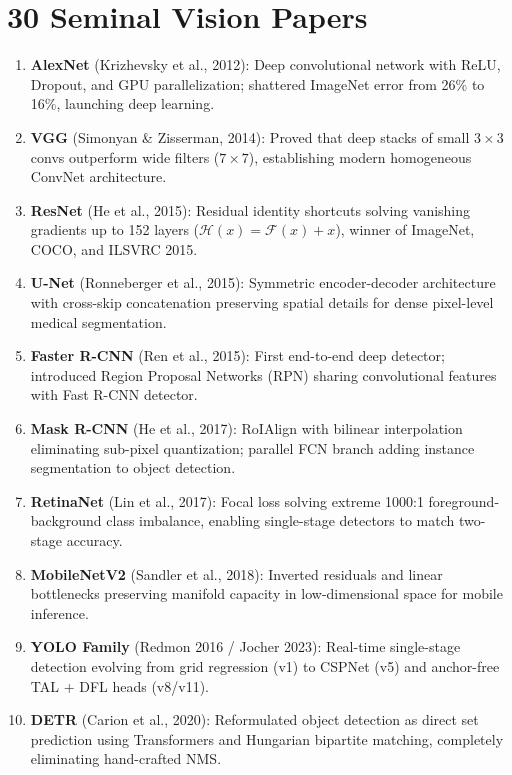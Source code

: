 \section{30 Seminal Vision Papers}\label{sec:papers}

\begin{enumerate}[leftmargin=*,itemsep=0.5pt,topsep=1pt]
\item \textbf{AlexNet} (Krizhevsky et al., 2012): Deep convolutional network with ReLU, Dropout, and GPU parallelization; shattered ImageNet error from 26\% to 16\%, launching deep learning.
\item \textbf{VGG} (Simonyan \& Zisserman, 2014): Proved that deep stacks of small $3\times 3$ convs outperform wide filters ($7\times 7$), establishing modern homogeneous ConvNet architecture.
\item \textbf{ResNet} (He et al., 2015): Residual identity shortcuts solving vanishing gradients up to 152 layers ($\mathcal{H}(x) = \mathcal{F}(x) + x$), winner of ImageNet, COCO, and ILSVRC 2015.
\item \textbf{U-Net} (Ronneberger et al., 2015): Symmetric encoder-decoder architecture with cross-skip concatenation preserving spatial details for dense pixel-level medical segmentation.
\item \textbf{Faster R-CNN} (Ren et al., 2015): First end-to-end deep detector; introduced Region Proposal Networks (RPN) sharing convolutional features with Fast R-CNN detector.
\item \textbf{Mask R-CNN} (He et al., 2017): RoIAlign with bilinear interpolation eliminating sub-pixel quantization; parallel FCN branch adding instance segmentation to object detection.
\item \textbf{RetinaNet} (Lin et al., 2017): Focal loss solving extreme 1000:1 foreground-background class imbalance, enabling single-stage detectors to match two-stage accuracy.
\item \textbf{MobileNetV2} (Sandler et al., 2018): Inverted residuals and linear bottlenecks preserving manifold capacity in low-dimensional space for mobile inference.
\item \textbf{YOLO Family} (Redmon 2016 / Jocher 2023): Real-time single-stage detection evolving from grid regression (v1) to CSPNet (v5) and anchor-free TAL + DFL heads (v8/v11).
\item \textbf{DETR} (Carion et al., 2020): Reformulated object detection as direct set prediction using Transformers and Hungarian bipartite matching, completely eliminating hand-crafted NMS.

\end{enumerate}
